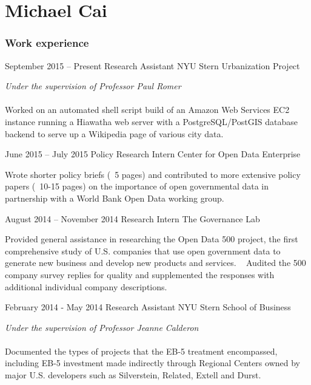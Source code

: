 \documentclass{tccv}
\begin{document}
\part{Michael Cai}

\section{Work experience}

\begin{eventlist}

\item{September 2015 -- Present}
     {Research Assistant}
     {NYU Stern Urbanization Project}

\textit{Under the supervision of Professor Paul Romer} \\~\\
Worked on an automated shell script build of an Amazon Web Services EC2 instance running a \newline Hiawatha web server with a PostgreSQL/PostGIS database backend to serve up a Wikipedia page of various city data. 

\item{June 2015 -- July 2015}
     {Policy Research Intern}
     {Center for Open Data Enterprise}

Wrote shorter policy briefs (~5 pages) and contributed to more extensive policy papers (~10-15 pages) on the importance of open governmental data in \newline partnership with a World Bank Open Data working group.

\item{August 2014 -- November 2014}
     {Research Intern}
     {The Governance Lab}

Provided general assistance in researching the Open Data 500 project, the first comprehensive study of U.S. companies that use open government data to generate new business and develop new products and services. \newline ~ \newline
Audited the 500 company survey replies for quality and supplemented the responses with additional individual company descriptions.

\item{February 2014 - May 2014}
     {Research Assistant}
     {NYU Stern School of Business}

\textit{Under the supervision of Professor Jeanne Calderon} \\~\\
Documented the types of projects that the EB-5 treatment encompassed, including EB-5 investment made indirectly through Regional Centers owned by major U.S. developers such as Silverstein, \newline Related, Extell and Durst.	

\end{eventlist}
\end{document}
